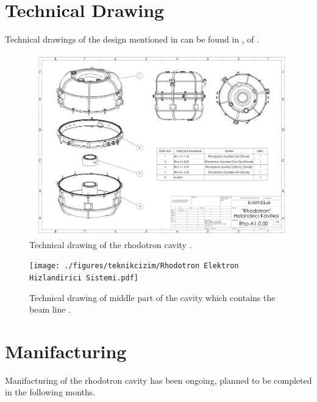 \documentclass[a4paper,oneside,12pt]{report}
\numberwithin{equation}{chapter}
\begin{document}
{%
\section{Technical Drawing}
Technical drawings of the design mentioned in  can be found in ,  of .

\begin{figure}
    \centering
    \includegraphics[angle=270,origin=c, width=.95\linewidth]{./figures/teknikcizim/Rho-A1.0.00.pdf}
    \vspace{20pt}
    \caption{Technical drawing of the rhodotron cavity \cite{sinan}.}
    \label{fig:techd_rhod}
\end{figure}

\begin{figure}
    \centering
    \texttt{[image: ./figures/teknikcizim/Rhodotron Elektron Hizlandirici Sistemi.pdf]}
    \vspace{20pt}
    \caption{Technical drawing of middle part of the cavity which contains the beam line \cite{sinan}.}
    \label{fig:techd_mid}
\end{figure}

\section{Manifacturing}

Manifacturing of the rhodotron cavity has been ongoing, planned to be completed in the following months.

}
\end{document}
